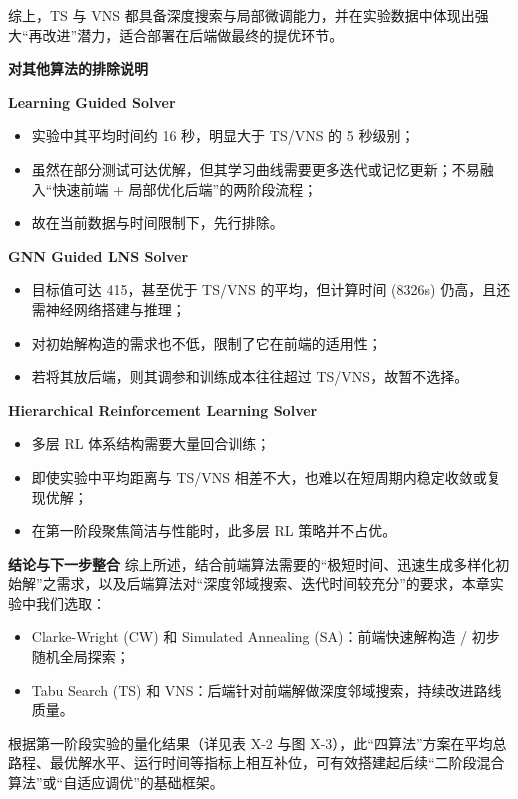 \documentclass[12pt,a4paper,twoside]{ctexbook}
\begin{document}
综上，TS 与 VNS 都具备深度搜索与局部微调能力，并在实验数据中体现出强大“再改进”潜力，适合部署在后端做最终的提优环节。

\textbf{对其他算法的排除说明}

\textbf{Learning Guided Solver}
\begin{itemize}
    \item 实验中其平均时间约 16 秒，明显大于 TS/VNS 的 5 秒级别；
    \item 虽然在部分测试可达优解，但其学习曲线需要更多迭代或记忆更新；不易融入“快速前端 + 局部优化后端”的两阶段流程；
    \item 故在当前数据与时间限制下，先行排除。
\end{itemize}

\textbf{GNN Guided LNS Solver}
\begin{itemize}
    \item 目标值可达 415，甚至优于 TS/VNS 的平均，但计算时间 (8326s) 仍高，且还需神经网络搭建与推理；
    \item 对初始解构造的需求也不低，限制了它在前端的适用性；
    \item 若将其放后端，则其调参和训练成本往往超过 TS/VNS，故暂不选择。
\end{itemize}

\textbf{Hierarchical Reinforcement Learning Solver}
\begin{itemize}
    \item 多层 RL 体系结构需要大量回合训练；
    \item 即使实验中平均距离与 TS/VNS 相差不大，也难以在短周期内稳定收敛或复现优解；
    \item 在第一阶段聚焦简洁与性能时，此多层 RL 策略并不占优。
\end{itemize}

\textbf{结论与下一步整合}
综上所述，结合前端算法需要的“极短时间、迅速生成多样化初始解”之需求，以及后端算法对“深度邻域搜索、迭代时间较充分”的要求，本章实验中我们选取：
\begin{itemize}
    \item Clarke-Wright (CW) 和 Simulated Annealing (SA)：前端快速解构造 / 初步随机全局探索；
    \item Tabu Search (TS) 和 VNS：后端针对前端解做深度邻域搜索，持续改进路线质量。
\end{itemize}

根据第一阶段实验的量化结果（详见表 X-2 与图 X-3），此“四算法”方案在平均总路程、最优解水平、运行时间等指标上相互补位，可有效搭建起后续“二阶段混合算法”或“自适应调优”的基础框架。
\end{document}
